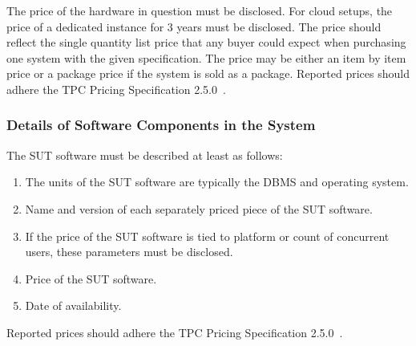 The price of the hardware in question must be disclosed. For cloud setups, the price of a dedicated instance for 3 years must be disclosed. The price should reflect the single quantity list price that any buyer could expect when purchasing one system with the given specification. The price may be either an item by item price or a package price if the system is sold as a package.
Reported prices should adhere the TPC Pricing Specification 2.5.0~\cite{pricing,tpc-pricing}.

\subsubsection{Details of Software Components in the System}
The SUT software must be described at least as follows:
\begin{enumerate}
    \item The units of the SUT software are typically the DBMS and operating system.
    \item Name and version of each separately priced piece of the SUT software.
    \item If the price of the SUT software is tied to platform or count of concurrent users, these parameters must be disclosed.
    \item Price of the SUT software.
    \item Date of availability.
\end{enumerate}
Reported prices should adhere the TPC Pricing Specification 2.5.0~\cite{pricing,tpc-pricing}.

